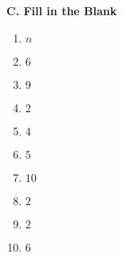 {\begin{minipage}{\textwidth}
    \vspace*{1.3ex}
    
    \noindent \textbf{C. Fill in the Blank} \\
        
    \begin{enumerate}
    	\item $ n $
    	\item $ 6 $
    	\item $ 9 $
    	\item $ 2 $
    	\item $ 4 $
    	\item $ 5 $
    	\item $ 10 $
    	\item $ 2 $
    	\item $ 2 $
    	\item $ 6 $
    \end{enumerate}
    \end{minipage}}
